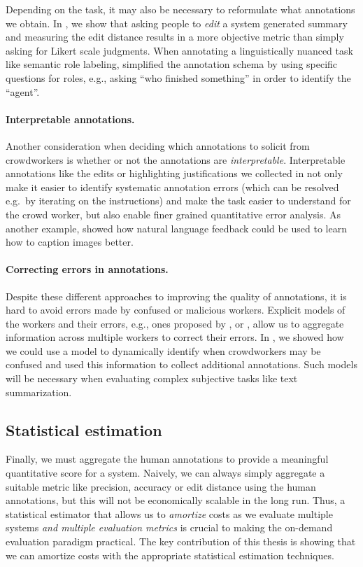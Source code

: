 Depending on the task, it may also be necessary to reformulate what annotations we obtain.
In , we show that asking people to \textit{edit} a system generated summary and measuring the edit distance results in a more objective metric than simply asking for Likert scale judgments.
When annotating a linguistically nuanced task like semantic role labeling, \citet{he2015question} simplified the annotation schema by using specific questions for roles, e.g., asking ``who finished something'' in order to identify the ``agent''.

\paragraph{Interpretable annotations.}
Another consideration when deciding which annotations to solicit from crowdworkers is whether or not the annotations are \textit{interpretable}.
Interpretable annotations like the edits or highlighting justifications we collected in  not only make it easier to identify systematic annotation errors (which can be resolved e.g.\ by iterating on the instructions) and make the task easier to understand for the crowd worker, but also enable finer grained quantitative error analysis.
As another example, \citet{ling2017teaching} showed how natural language feedback could be used to learn how to caption images better.

\paragraph{Correcting errors in annotations.}
Despite these different approaches to improving the quality of annotations, it is hard to avoid errors made by confused or malicious workers.
Explicit models of the workers and their errors, e.g., ones proposed by \citet{dawid1979maximum}, \citet{passonneau2014benefits} or \citet{branson2017lean}, allow us to aggregate information across multiple workers to correct their errors.
In , we showed how we could use a model to dynamically identify when crowdworkers may be confused and used this information to collect additional annotations.
Such models will be necessary when evaluating complex subjective tasks like text summarization.

\subsection{Statistical estimation}
Finally, we must aggregate the human annotations to provide a meaningful quantitative score for a system.
Naively, we can always simply aggregate a suitable metric like precision, accuracy or edit distance using the human annotations, but this will not be economically scalable in the long run.
Thus, a statistical estimator that allows us to \textit{amortize} costs as we evaluate multiple systems \textit{and multiple evaluation metrics} is crucial to making the on-demand evaluation paradigm practical.
The key contribution of this thesis is showing that we can amortize costs with the appropriate statistical estimation techniques.

